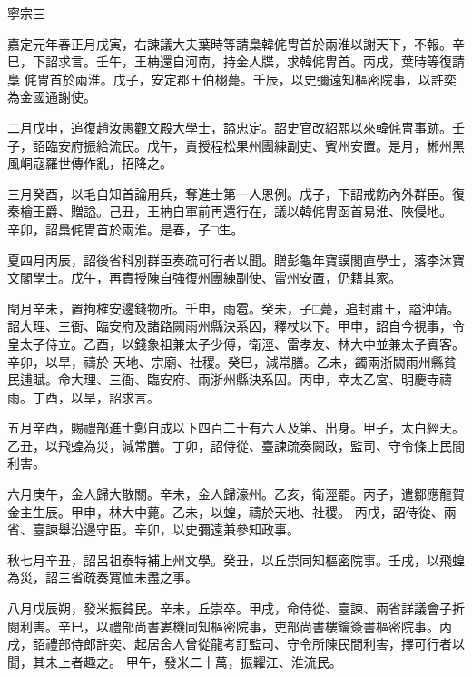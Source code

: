 
\begin{pinyinscope}

 寧宗三



 嘉定元年春正月戊寅，右諫議大夫葉時等請梟韓侂冑首於兩淮以謝天下，不報。辛巳，下詔求言。壬午，王柟還自河南，持金人牒，求韓侂冑首。丙戌，葉時等復請梟
 侂冑首於兩淮。戊子，安定郡王伯栩薨。壬辰，以史彌遠知樞密院事，以許奕為金國通謝使。



 二月戊申，追復趙汝愚觀文殿大學士，謚忠定。詔史官改紹熙以來韓侂冑事跡。壬子，詔臨安府振給流民。戊午，責授程松果州團練副吏、賓州安置。是月，郴州黑風峒寇羅世傳作亂，招降之。



 三月癸酉，以毛自知首論用兵，奪進士第一人恩例。戊子，下詔戒飭內外群臣。復秦檜王爵、贈謚。己丑，王柟自軍前再還行在，議以韓侂冑函首易淮、陜侵地。
 辛卯，詔梟侂冑首於兩淮。是春，子□生。



 夏四月丙辰，詔後省科別群臣奏疏可行者以聞。贈彭龜年寶謨閣直學士，落李沐寶文閣學士。戊午，再責授陳自強復州團練副使、雷州安置，仍籍其家。



 閏月辛未，置拘榷安邊錢物所。壬申，雨雹。癸未，子□薨，追封肅王，謚沖靖。詔大理、三衙、臨安府及諸路闕雨州縣決系囚，釋杖以下。甲申，詔自今視事，令皇太子侍立。乙酉，以錢象祖兼太子少傅，衛涇、雷孝友、林大中並兼太子賓客。辛卯，以旱，禱於
 天地、宗廟、社稷。癸巳，減常膳。乙未，蠲兩浙闕雨州縣貧民逋賦。命大理、三衙、臨安府、兩浙州縣決系囚。丙申，幸太乙宮、明慶寺禱雨。丁酉，以旱，詔求言。



 五月辛酉，賜禮部進士鄭自成以下四百二十有六人及第、出身。甲子，太白經天。乙丑，以飛蝗為災，減常膳。丁卯，詔侍從、臺諫疏奏闕政，監司、守令條上民間利害。



 六月庚午，金人歸大散關。辛未，金人歸濠州。乙亥，衛涇罷。丙子，遣鄒應龍賀金主生辰。甲申，林大中薨。乙未，以蝗，禱於天地、社稷。
 丙戌，詔侍從、兩省、臺諫舉沿邊守臣。辛卯，以史彌遠兼參知政事。



 秋七月辛丑，詔呂祖泰特補上州文學。癸丑，以丘崇同知樞密院事。壬戌，以飛蝗為災，詔三省疏奏寬恤未盡之事。



 八月戊辰朔，發米振貧民。辛未，丘崇卒。甲戌，命侍從、臺諫、兩省詳議會子折閱利害。辛巳，以禮部尚書婁機同知樞密院事，吏部尚書樓鑰簽書樞密院事。丙戌，詔禮部侍郎許奕、起居舍人曾從龍考訂監司、守令所陳民間利害，擇可行者以聞，其未上者趣之。
 甲午，發米二十萬，振糶江、淮流民。




\end{pinyinscope}
